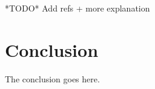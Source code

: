 \documentclass[journal]{IEEEtran}
\begin{document}
*TODO* Add refs + more explanation


\section{Conclusion}
The conclusion goes here.







\end{document}
